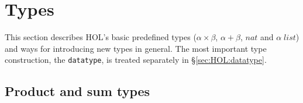     







\section{Types}\label{sec:HOL:Types}
This section describes HOL's basic predefined types ($\alpha \times \beta$,
$\alpha + \beta$, $nat$ and $\alpha \; list$) and ways for introducing new
types in general.  The most important type construction, the
\texttt{datatype}, is treated separately in {\S}\ref{sec:HOL:datatype}.


\subsection{Product and sum types}
\label{subsec:prod-sum}

